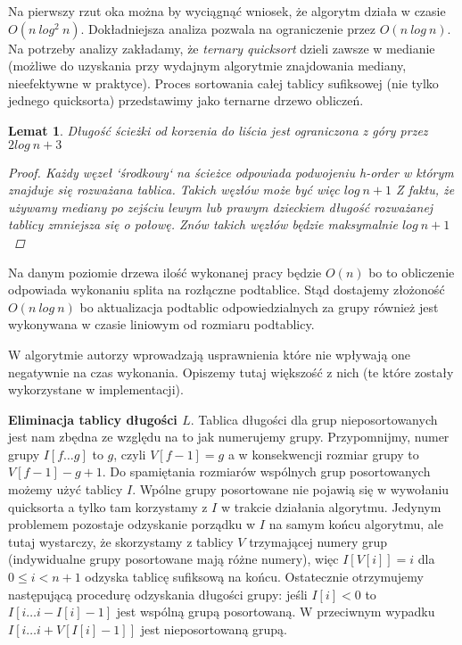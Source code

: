 \documentclass[12pt]{article}
\newtheorem*{lemma}{Lemat}
\begin{document}
Na pierwszy rzut oka można by wyciągnąć wniosek, że algorytm działa w czasie $O(n\ log^2\ n)$. Dokładniejsza analiza pozwala na ograniczenie przez $O(n\ log\ n)$. Na potrzeby analizy zakładamy, że \textit{ternary quicksort} dzieli zawsze w medianie (możliwe do uzyskania przy wydajnym algorytmie znajdowania mediany, nieefektywne w praktyce). Proces sortowania całej tablicy sufiksowej (nie tylko jednego quicksorta) przedstawimy jako ternarne drzewo obliczeń.

\begin{lemma}
Długość ścieżki od korzenia do liścia jest ograniczona z góry przez $2 log\ n + 3$
\begin{proof}
Każdy węzeł `środkowy` na ścieżce odpowiada podwojeniu \textit{h-order} w którym znajduje się rozważana tablica. Takich węzłów może być więc $log\ n + 1$ Z faktu, że używamy mediany po zejściu lewym lub prawym dzieckiem długość rozważanej tablicy zmniejsza się o połowę. Znów takich węzłów będzie maksymalnie $log\ n + 1$
\end{proof}
\end{lemma}
Na danym poziomie drzewa ilość wykonanej pracy będzie $O(n)$ bo to obliczenie odpowiada wykonaniu splita na rozłączne podtablice. Stąd dostajemy złożoność $O(n\ log\ n)$ bo aktualizacja podtablic odpowiedzialnych za grupy również jest wykonywana w czasie liniowym od rozmiaru podtablicy.

W algorytmie autorzy wprowadzają usprawnienia które nie wpływają one negatywnie na czas wykonania. Opiszemy tutaj większość z nich (te które zostały wykorzystane w implementacji).

\textbf{Eliminacja tablicy długości $L$}. Tablica długości dla grup nieposortowanych jest nam zbędna ze względu na to jak numerujemy grupy. Przypomnijmy, numer grupy $I[f \ldots g]$ to $g$, czyli $V[f-1] = g$ a w konsekwencji rozmiar grupy to $V[f-1] - g + 1$. Do spamiętania rozmiarów wspólnych grup posortowanych możemy użyć tablicy $I$. Wpólne grupy posortowane nie pojawią się w wywołaniu quicksorta a tylko tam korzystamy z $I$ w trakcie działania algorytmu. Jedynym problemem pozostaje odzyskanie porządku w $I$ na samym końcu algorytmu, ale tutaj wystarczy, że skorzystamy z tablicy $V$ trzymającej numery grup (indywidualne grupy posortowane mają różne numery), więc $I[V[i]] = i$ dla $0 \leq i < n+1$ odzyska tablicę sufiksową na końcu. Ostatecznie otrzymujemy następującą procedurę odzyskania długości grupy: jeśli $I[i] < 0$ to $I[i \ldots i - I[i] - 1]$ jest wspólną grupą posortowaną. W przeciwnym wypadku $I[i \ldots i + V[I[i]-1]]$ jest nieposortowaną grupą. 
\end{document}
